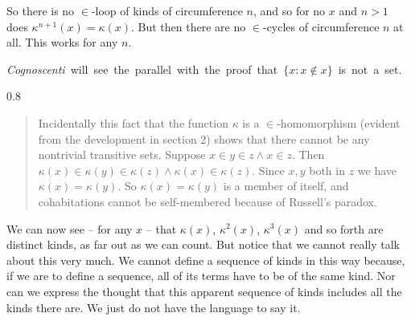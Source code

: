 \documentclass[12pt]{article}
\renewcommand{\smallpara}[1]{\begin{footnotesize}\begin{spacing}{0.8}\begin{quote} #1  \end{quote}\end{spacing}\end{footnotesize}}
\begin{document}
So there is no $\in$-loop of kinds of circumference $n$, and so for no
$x$ and $n>1$ does $\kappa^{n+1}(x) = \kappa(x)$.  But then there are
no $\in$-cycles of circumference $n$ at all.  This works for any $n$.

\endproof

\noindent\mbox{{\sl Cognoscenti} will see the parallel with the proof that $\{x: x \not\in x\}$ is not a set.}

\label{C+}
\smallpara{Incidentally this fact that the function $\kappa$ is a $\in$-homomorphism (evident from the development in section 2)
shows that there cannot be any nontrivial transitive
sets.  Suppose $x \in y \in z \wedge x \in z$.  Then $\kappa(x) \in \kappa(y) \in
\kappa(z) \wedge \kappa(x) \in \kappa(z)$. Since $x, y$ both in $z$ we have $\kappa(x) =
\kappa(y)$.  So $\kappa(x)= \kappa(y)$ is a member of itself, and cohabitations
cannot be self-membered because of Russell's paradox.
}




We can now see -- for any $x$ --  that $\kappa(x)$, $\kappa^2(x)$, $\kappa^3(x)$ and so forth are distinct kinds, as far out as we can count.  But notice that we cannot really talk about this very much.  We cannot define a sequence of kinds in this way because, if we are to define a sequence, all of its terms have to be of the same kind. Nor can we express the thought that this apparent sequence of kinds includes all the kinds there are.  We just do not have the language to say it.
\end{document}
